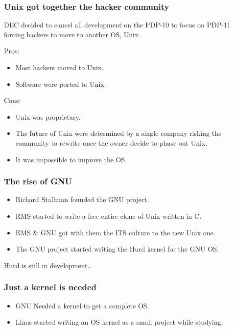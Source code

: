 \documentclass[hyperref={pdfpagelabels=false},xcolor=pst,pdf,fragile]{beamer}
\begin{document}
\begin{frame}
  \frametitle{Unix got together the hacker community}

  DEC decided to cancel all development on the PDP-10 to focus on PDP-11
  forcing hackers to move to another OS, Unix.

  \pause

  Pros:
  \begin{itemize}
	  \item Most hackers moved to Unix.
	  \item Software were ported to Unix.
  \end{itemize}

  \pause

  Cons:
  \begin{itemize}
	  \item Unix was proprietary.
	  \item The future of Unix were determined by a single company risking
		  the community to rewrite once the owner decide to phase out Unix.
	  \item It was impossible to improve the OS.
  \end{itemize}

\end{frame}

\begin{frame}
  \frametitle{The rise of GNU}

  \begin{itemize}
	  \item Richard Stallman founded the GNU project.
	  \item RMS started to write a \alert{free} entire clone of Unix written in C.
	  \item RMS \& GNU got with them the ITS culture to the new Unix one.
	  \item The GNU project started writing the Hurd kernel for the GNU OS.
  \end{itemize}

  \hskip-20pt
  \pause
  \begin{center}
	  Hurd is still in development\ldots
  \end{center}

\end{frame}

\begin{frame}
  \frametitle{Just a kernel is needed}

  \begin{itemize}
	  \item GNU Needed a kernel to get a complete OS.
	  \item Linus started writing an OS kernel as a small project while
		  studying.
  \end{itemize}

\end{frame}
\end{document}
